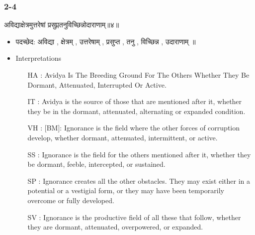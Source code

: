 \begin{frame}[fragile]\frametitle{2-4}
\begin{sanskrit}
अविद्याक्षेत्रमुत्तरेषां प्रसुप्ततनुविच्छिन्नोदाराणाम्॥४॥
\end{sanskrit}

	\begin{itemize}
	\item पदच्छेद: अविद्या , क्षेत्रम् , उत्तरेषाम् , प्रसुप्त , तनु , विच्छिन्न , उदाराणाम् ॥
	\item Interpretations
		\begin{itemize}
		\item [HA]: Avidya Is The Breeding Ground For The Others Whether They Be Dormant, Attenuated, Interrupted Or Active.
		\item [IT]: Avidya is the source of those that are mentioned after it, whether they be in the dormant, attenuated, alternating or expanded condition.
		\item [VH]: [BM]: Ignorance is the field where the other forces of corruption develop, whether dormant, attenuated, intermittent, or active.
		\item [SS]: Ignorance is the field for the others mentioned after it, whether they be dormant, feeble, intercepted, or sustained.
		\item [SP]: Ignorance creates all the other obstacles. They may exist either in a potential or a vestigial form, or they may have been temporarily overcome or fully developed.
		\item [SV]: Ignorance is the productive field of all these that follow, whether they are dormant, attenuated, overpowered, or expanded. 
		\end{itemize}
	\end{itemize}
	
\end{frame}



